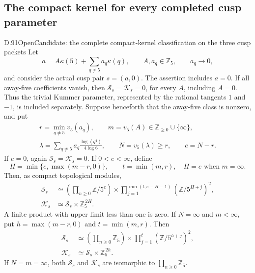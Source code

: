 \subsection{The compact kernel for every completed cusp parameter}

\begin{statement}{D.91}{Open}{Candidate: the complete compact-kernel classification on the three cusp packets}
Let
\[
 a=A\kappa(5)+\sum_{q\ne5}a_q\kappa(q),\qquad
 A,a_q\in\mathbb Z_5,\qquad a_q\longrightarrow0,
                                                               \tag{D.91.1}
\]
and consider the actual cusp pair \(s=(a,0)\). The assertion
includes \(a=0\). If all away-five coefficients vanish, then
\(\mathcal S_s=\mathcal K_s=0\), for every \(A\), including
\(A=0\). Thus the trivial Kummer parameter, represented by
the rational tangents \(1\) and \(-1\), is included separately.
Suppose henceforth that the away-five class is nonzero, and put
\[
 \begin{gathered}
 r=\min_{q\ne5}v_5(a_q),\qquad m=v_5(A)\in
                  \mathbb Z_{\ge0}\cup\{\infty\},\\
 \lambda=\sum_{q\ne5}a_q\frac{\log(q^4)}{4\log6},\qquad
 N=v_5(\lambda)\ge r,\qquad e=N-r.
 \end{gathered}                                                \tag{D.91.2}
\]
If \(e=0\), again \(\mathcal S_s=\mathcal K_s=0\).
If \(0<e<\infty\), define
\[
 H=\min\{e,\max(m-r,0)\},\qquad t=\min(m,r),
 \quad H=e\text{ when }m=\infty.
                                                               \tag{D.91.3}
\]
Then, as compact topological modules,
\[
 \begin{aligned}
 \mathcal S_s&\simeq
 \left(\prod_{n\ge0}\mathbb Z/5^e\right)
 \times\prod_{j=1}^{\min(t,e-H-1)}
                      (\mathbb Z/5^{H+j})^2,\\
 \mathcal K_s&\simeq\mathcal S_s\times\mathbb Z_5^{\,2H}.
 \end{aligned}                                                \tag{D.91.4}
\]
A finite product with upper limit less than one is zero.
If \(N=\infty\) and \(m<\infty\), put
\(h=\max(m-r,0)\) and \(t=\min(m,r)\). Then
\[
 \begin{aligned}
 \mathcal S_s&\simeq
 \left(\prod_{n\ge0}\mathbb Z_5\right)
          \times\prod_{j=1}^{t}(\mathbb Z/5^{h+j})^2,\\
 \mathcal K_s&\simeq\mathcal S_s\times\mathbb Z_5^{\,2h}.
 \end{aligned}                                                \tag{D.91.5}
\]
If \(N=m=\infty\), both \(\mathcal S_s\) and
\(\mathcal K_s\) are isomorphic to \(\prod_{n\ge0}\mathbb Z_5\).


\end{statement}
